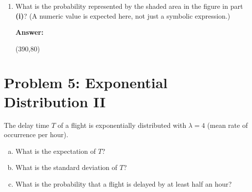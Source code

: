 \documentclass[11pt,twoside]{article}
\newcommand{\pts}[1]{\marginpar{ \small\hspace{0pt} \textit{[#1]} } }
\numberwithin{equation}{section}
\newcommand{\?}{\stackrel{?}{=}}
\newcommand{\gr}{\color{green!40!black}}
\newcommand{\la}{\lambda}
\begin{document}
\begin{enumerate}[\bf (a)]
  \bigskip
  \bigskip
  
\item What is the probability represented by the shaded area in the figure in part \textbf{(i)}? \pts{2} (A numeric value
  is expected here, not just a symbolic expression.)

  \vspace{2ex}
    \begin{minipage}[]{.1\linewidth}
    {\bf Answer:}
  \end{minipage}\qquad
  \begin{minipage}[]{.8\linewidth}
    \framebox(390,80){\phantom{\Huge t}   }     
  \end{minipage}

  
    \end{enumerate}
\eject

\section*{Problem 5: Exponential Distribution II }
The delay time $T$ of a flight is exponentially distributed with $\la = 4$ (mean rate of occurrence per hour).


\begin{enumerate}[(a)]
\item What is the expectation of $T$? \pts{1}
  \vspace{10ex}

\item What is the standard deviation of $T$? \pts{1}
  \vspace{10ex}

  
\item What is the probability that a flight is delayed by at least half an hour? \pts{2}
  \vspace{25ex}
  
\end{enumerate}
\end{document}
